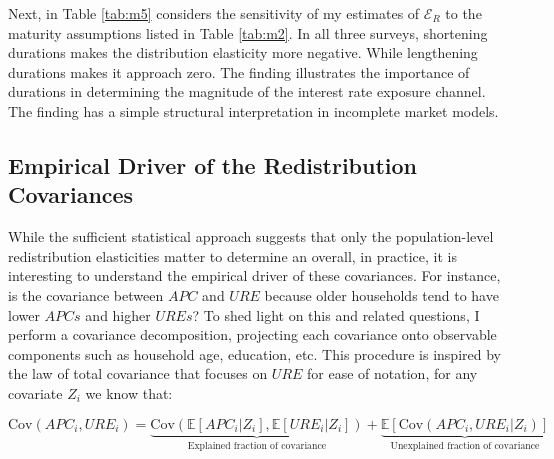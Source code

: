 \documentclass[11pt,letterpaper]{article}
\begin{document}
Next, in Table \ref{tab:m5} considers the sensitivity of my estimates of $\mathcal{E}_{R}$ to the maturity assumptions listed in Table \ref{tab:m2}. In all three surveys, shortening durations makes the distribution elasticity more negative. While lengthening durations makes it approach zero. The finding illustrates the importance of durations in determining the magnitude of the interest rate exposure channel. The finding has a simple structural interpretation in incomplete market models. 

\subsection{Empirical Driver of the Redistribution Covariances}\label{sec:cova} 

While the sufficient statistical approach suggests that only the population-level redistribution elasticities matter to determine an overall, in practice, it is interesting to understand the empirical driver of these covariances. For instance, is the covariance between $APC$ and $URE$ because older households tend to have lower $APCs$ and higher $UREs$? To shed light on this and related questions, I perform a covariance decomposition, projecting each covariance onto observable components such as household age, education, etc. This procedure is inspired by the law of total covariance that focuses on $URE$ for ease of notation, for any covariate $Z_{i}$ we know that: 

\begin{equation}\label{eq:23}
\mathrm{Cov}(APC_{i}, URE_{i}) = \underbrace{\mathrm{Cov}(\mathbb{E} \left[APC_{i} | Z_{i}\right], \mathbb{E} \left[URE_{i} | Z_{i}\right])}_{\text{Explained fraction of covariance}} + \underbrace{\mathbb{E}\left[\mathrm{Cov} (APC_{i}, URE_{i} | Z_{i})\right]}_{\text{Unexplained fraction of covariance}}
\end{equation}
\end{document}
